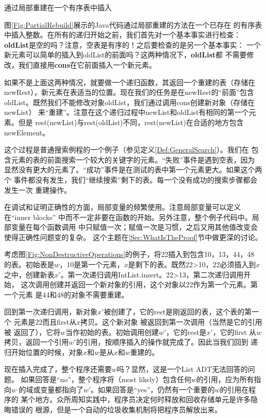 \begin{example}
通过局部重建在一个有序表中插入

图\ref{Fig:PartialRebuild}展示的Java代码通过局部重建的方法在一个已存在
的有序表中插入整数。在所有的递归开始之前，我们首先对一个基本事实进行检查：
\textbf{oldList}是空的吗？注意，空表是有序的！之后要检查的是另一个基本事实：
一个新元素可以简单的插入到oldList的前面吗？这两种情况下，\textbf{oldList}都
不需要修改，我们直接用\textbf{cons}在它前面插入一个新元素。

如果不是上面这两种情况，就要做一个递归函数，其返回一个重建的表（存储在
newRest），新元素在表适当的位置。现在我们的任务是在newRest的“前面”包含
oldList。既然我们不能修改对象oldList，我们通过调用cons创建新对象（存储在newList）
来“重建”。注意在这个递归过程中newList和oldList有相同的第一个元素。但是
rest(newList)与rest(oldList)不同，rest(newList)在合适的地方包含newElement。

这个过程是普通搜索例程的一个例子（参见定义\ref{Def:GeneralSearch}）。我们在
包含元素的表的前面搜索一个较大的关键字的元素。“失败”事件是遇到空表，因为
显然没有更大的元素了。“成功”事件是在测试的表中第一个元素更大。如果这个两个
事件都没有发生，我们“继续搜索”剩下的表。每一个没有成功的搜索步骤都会发生一次
重建操作。

在调试和证明正确性的方面，局部变量的频繁使用。注意局部变量可以定义在“inner blocks”
中而不一定非要在函数的开始。另外注意，整个例子代码中。局部变量在每个函数调用
中只赋值一次；赋值一次是习惯，之后又用其他值改变会使得正确性问题变的复杂。
这个主题在\ref{Sec:WhatIsTheProof}节中做更深的讨论。

考虑图\ref{Fig:NonDestructiveOperations}的例子，将22插入到包含10，13，44，48
的表。初始表是$w$，10是第一个元素，$x$是剩下的表。既然22>10，22必须插入到$x$
之中，创建新表$x'$。第一次递归调用IntList.insert。22>13，第二次递归调用开始，
这次调用创建并返回一个新对象的引用，这个对象以22作为第一个元素。第一个元素
是44和48的对象不需要重建。

回到第一次递归调用，新对象$x'$被创建了，它的rest是刚返回的表，这个表的第一个
元素是22而且first从$x$拷贝。这个新对象 被返回到第一次调用（当然是它的引用被
返回了），它将$w$当作初始的表。初始调用创建$w'$，它的rest是$x'$，它的first
从$w$拷贝，返回一个引用$w'$的引用，按顺序插入的操作就完成了。因此当我们回到
递归开始位置的时候，对象$x$和$w$是从$x$和$w$重建的。

现在插入完成了，整个程序还需要$w$吗？显然，这是一个List ADT无法回答的问题。
如果回答是“no”，整个程序将（most likely）包含任何$w$的引用，应为所有指向$w$
的域或变量都指向了$w'$。如果回答是“yes”，仍然有一个重要的$w$的引用在程序的
某个地方。众所周知实践中，程序员决定何时释放和回收存储单元是许多隐晦错误的
根源，但是一个自动的垃圾收集机制将把程序员解放出来。


\end{example}
